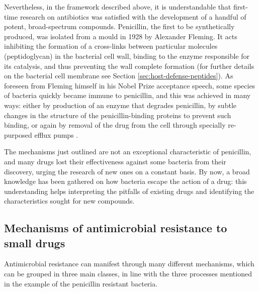 Nevertheless, in the framework described above, it is understandable that first-time research on antibiotics was satisfied with the development of a handful of potent, broad-spectrum compounds.
%
Penicillin, the first to be synthetically produced, was isolated from a mould in 1928 by Alexander Fleming. It acts inhibiting the formation of a cross-links between particular molecules (peptidoglycan) in the bacterial cell wall, binding to the enzyme responsible for its catalysis, and thus preventing the wall complete formation \citep{Gordon2000} (for further details on the bacterial cell membrane see Section \ref{sec:host-defense-peptides}).
%
As foreseen from Fleming himself in his Nobel Prize acceptance speech, some species of bacteria quickly became immune to penicillin, and this was achieved in many ways: either by production of an enzyme that degrades penicillin, by subtle changes in the structure of the penicillin-binding proteins to prevent such binding, or again by removal of the drug from the cell through specially re-purposed efflux pumps \citep{Lobanovska2017}.

The mechanisms just outlined are not an exceptional characteristic of penicillin, and many drugs lost their effectiveness against some bacteria from their discovery, urging the research of new ones on a constant basis. By now, a broad knowledge has been gathered on how bacteria escape the action of a drug: this understanding helps interpreting the pitfalls of existing drugs and identifying the characteristics sought for new compounds.


\subsection{Mechanisms of antimicrobial resistance to small drugs} \label{sec:AMR_mechs}
Antimicrobial resistance can manifest through many different mechanisms, which can be grouped in three main classes, in line with the three processes mentioned in the example of the penicillin resistant bacteria.

